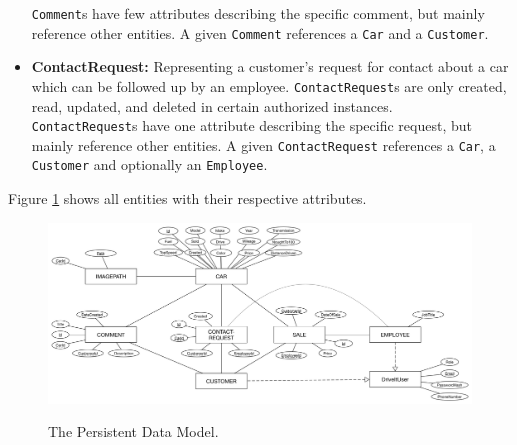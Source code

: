 \begin{itemize}
	\texttt{Comment}s have few attributes describing the specific comment, but mainly reference other entities. A given \texttt{Comment} references a \texttt{Car} and a \texttt{Customer}.
	\item \textbf{ContactRequest:} Representing a customer's request for contact about a car which can be followed up by an employee. \texttt{ContactRequest}s are only created, read, updated, and deleted in certain authorized instances.\\
	\texttt{ContactRequest}s have one attribute describing the specific request, but mainly reference other entities. A given \texttt{ContactRequest} references a \texttt{Car}, a \texttt{Customer} and optionally an \texttt{Employee}.
\end{itemize}
Figure \ref{fig:persistentDataModel} shows all entities with their respective attributes.
	\begin{figure}[H]
		\centering
		\includegraphics[width=\textwidth]{Figures/PersistentDataModel}\\
		\caption{The Persistent Data Model.}
		\label{fig:persistentDataModel}
	\end{figure}
